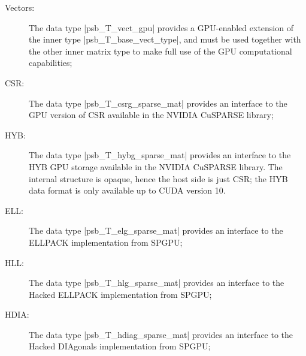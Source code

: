 \begin{description}
\item[Vectors:] The data type \fortinline|psb_T_vect_gpu| provides a
  GPU-enabled extension of the inner type \fortinline|psb_T_base_vect_type|,
  and must be used together with the other inner matrix type to make
  full use of the GPU computational capabilities;
\item[CSR:] The data type \fortinline|psb_T_csrg_sparse_mat| provides an
  interface to the GPU version of CSR available in the NVIDIA CuSPARSE
  library;
\item[HYB:] The data type \fortinline|psb_T_hybg_sparse_mat| provides an
  interface to the HYB GPU storage  available in the NVIDIA CuSPARSE
  library. The internal structure is opaque, hence the host side is
  just CSR; the HYB data format is only available up to CUDA version
  10. 
\item[ELL:] The data type \fortinline|psb_T_elg_sparse_mat| provides an
  interface to the  ELLPACK implementation from SPGPU;

\item[HLL:] The data type \fortinline|psb_T_hlg_sparse_mat| provides an
  interface to the  Hacked ELLPACK implementation from SPGPU;
\item[HDIA:] The data type \fortinline|psb_T_hdiag_sparse_mat| provides an
  interface to the  Hacked DIAgonals implementation from SPGPU;
\end{description}


